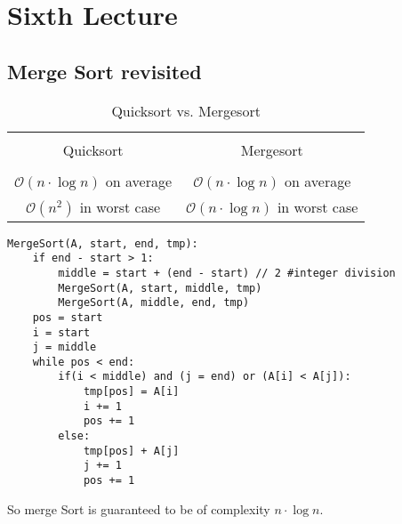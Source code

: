 \documentclass[a4paper]{article}
\begin{document}
\section{Sixth Lecture}
\subsection{Merge Sort revisited}
\begin{table}[H]
    \centering
    \caption{Quicksort vs. Mergesort}
    \label{tab:sorting}
    \begin{tabular}{cc}
        \toprule \\
        Quicksort & Mergesort \\
        \midrule \\
        $ \mathcal{O}(n \cdot \log{n}) $ on average & $ \mathcal{O}(n \cdot \log{n}) $ on average \\
        $ \mathcal{O}(n^2) $ in worst case & $ \mathcal{O}(n \cdot \log{n}) $ in worst case \\
        \bottomrule
    \end{tabular}
\end{table}

\begin{lstlisting}
MergeSort(A, start, end, tmp):
    if end - start > 1:
        middle = start + (end - start) // 2 #integer division
        MergeSort(A, start, middle, tmp)
        MergeSort(A, middle, end, tmp)
    pos = start
    i = start
    j = middle
    while pos < end:
        if(i < middle) and (j = end) or (A[i] < A[j]):
            tmp[pos] = A[i]
            i += 1
            pos += 1
        else:
            tmp[pos] + A[j]
            j += 1
            pos += 1
\end{lstlisting}
So merge Sort is guaranteed to be of complexity $ n \cdot \log{n} $. 
\end{document}
